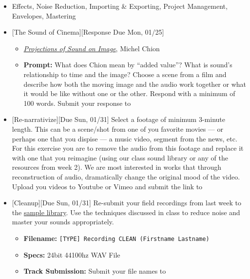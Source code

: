 \def\dMon{Mon, 01/25}
\def\dTues{Tues, 01/26}
\def\dWed{Wed, 01/27}
\def\dThur{Thur, 01/28}
\def\dFri{Fri, 01/29}
\def\dSat{Sat, 01/30}
\def\dSun{Sun, 01/31}
\placeDate

\begin{itemize}[noitemsep,topsep=0pt,leftmargin=*]
	\item {} Effects, Noise Reduction, Importing \& Exporting, Project Management, Envelopes, Mastering
	\item {}[The Sound of Cinema][Response Due \dMon]
	      \begin{itemize}
		      \item \href{supplements/MICHEL_CHION_PROJECTIONS_OF_SOUND_ON_IMAGE.pdf}{\emph{Projections of Sound on Image}}, Michel Chion
		      \item \textbf{Prompt:} What does Chion mean by ``added value''? What is sound's relationship to time and the image? Choose a scene from a film and describe how both the moving image and the audio work together or what it would be like without one or the other. Respond with a minimum of 100 words. Submit your response to \discordR
	      \end{itemize}
	\item {}[Re-narrativize][Due \dSun] \newline
	      Select a footage of minimum 3-minute length. This can be a scene/shot from one of you favorite movies --- or perhaps one that you dispise --- a music video, segment from the news, etc. For this exercise you are to remove the audio from this footage and replace it with one that you reimagine (using our class sound library or any of the resources from week 2). We are most interested in works that through reconstruction of audio, dramatically change the original mood of the video. Upload you videos to Youtube or Vimeo and submit the link to \discordE
	\item {}[Cleanup][Due \dSun] \newline
	      Re-submit your field recordings from last week to the \href{\samplelibPermURL}{sample library}. Use the techniques discussed in class to reduce noise and master your sounds appropriately.
	      \begin{itemize}
		      \item \textbf{Filename:} \texttt{[TYPE] Recording CLEAN (Firstname Lastname)}
		      \item \textbf{Specs:} 24bit 44100hz WAV File
		      \item \textbf{Track Submission:} Submit your file names to \discordS

\end{itemize}
\end{itemize}
